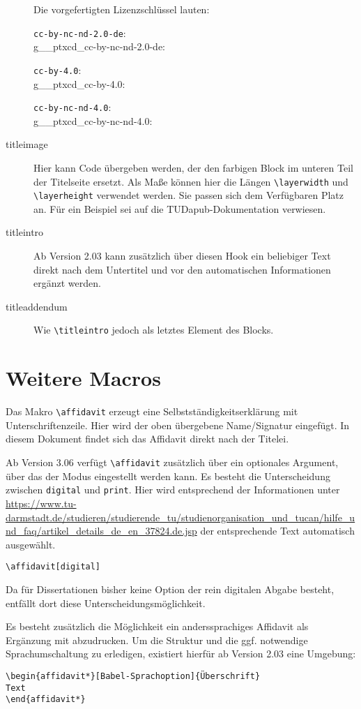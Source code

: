 \documentclass[
	ngerman,
	ruledheaders=section,%
	class=report,%
	thesis={type=bachelor},%
	accentcolor=9c,%
	custommargins=true,%
	marginpar=false,%
	parskip=half-,%
	fontsize=11pt,%
]{tudapub}
\let\code\texttt
\let\tbs\textbackslash
\newcommand*{\printlicensedemo}[1]{\par\texttt{#1}:\\
	\begingroup\urlstyle{same}\small\csname g__ptxcd_#1:\endcsname\par\endgroup}
\begin{document}
\begin{description}
	Die vorgefertigten Lizenzschlüssel lauten:
	\printlicensedemo{cc-by-nc-nd-2.0-de}
	\printlicensedemo{cc-by-4.0}
	\printlicensedemo{cc-by-nc-nd-4.0}
	\item[titleimage] Hier kann Code übergeben werden, der den farbigen Block im unteren Teil der Titelseite ersetzt. Als Maße können hier die Längen \verb+\layerwidth+ und \verb+\layerheight+ verwendet werden. Sie passen sich dem Verfügbaren Platz an. Für ein Beispiel sei auf die TUDapub-Dokumentation verwiesen.
	\item[titleintro] Ab Version 2.03 kann zusätzlich über diesen Hook ein beliebiger Text direkt nach dem Untertitel und vor den automatischen Informationen ergänzt werden.
	\item[titleaddendum] Wie \code{\tbs{}titleintro} jedoch als letztes Element des Blocks.
\end{description}

\section{Weitere Macros}
Das Makro \verb+\affidavit+ erzeugt eine Selbstständigkeitserklärung mit Unterschriftenzeile. Hier wird der oben übergebene Name/Signatur eingefügt.
In diesem Dokument findet sich das Affidavit direkt nach der Titelei.

Ab Version 3.06 verfügt \verb+\affidavit+ zusätzlich über ein optionales Argument, über das der Modus eingestellt werden kann.
Es besteht die Unterscheidung zwischen \verb+digital+ und \verb+print+. Hier wird entsprechend der Informationen unter \url{https://www.tu-darmstadt.de/studieren/studierende_tu/studienorganisation_und_tucan/hilfe_und_faq/artikel_details_de_en_37824.de.jsp} der entsprechende Text automatisch ausgewählt.

\begin{verbatim}
\affidavit[digital]
\end{verbatim}

Da für Dissertationen bisher keine Option der rein digitalen Abgabe besteht, entfällt dort diese Unterscheidungsmöglichkeit.

Es besteht zusätzlich die Möglichkeit ein anderssprachiges Affidavit als Ergänzung mit abzudrucken. Um die Struktur und die ggf. notwendige Sprachumschaltung zu erledigen, existiert hierfür ab Version 2.03 eine Umgebung:

\begin{verbatim}
\begin{affidavit*}[Babel-Sprachoption]{Überschrift}
Text
\end{affidavit*}
\end{verbatim}
\end{document}
